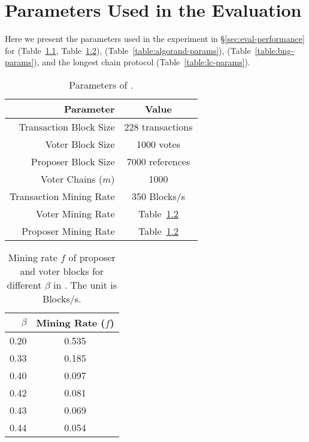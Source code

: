 \chapter{Parameters Used in the Evaluation}
\label{apx:datapoints}

Here we present the parameters used in the experiment in \S\ref{sec:eval-performance} for \prism (Table~\ref{table:prism-params}, Table~\ref{table:prism-beta}), \algorand (Table~\ref{table:algorand-params}), \bng (Table~\ref{table:bng-params}), and the longest chain protocol (Table~\ref{table:lc-params}).

\begin{table}[t]
	\centering
	\caption{Parameters of \prism.}
	\begin{tabular}{ r | c } 
	 \hline
	 Parameter & Value \\ [0.5ex] 
	 \hline\hline
	 Transaction Block Size & 228 transactions \\
	 Voter Block Size & 1000 votes \\
	 Proposer Block Size & 7000 references \\
	 Voter Chains ($m$) & 1000 \\
	 Transaction Mining Rate & 350 Blocks/s \\
	 Voter Mining Rate & Table~\ref{table:prism-beta}\\
	 Proposer Mining Rate & Table~\ref{table:prism-beta}\\
	 \hline
	\end{tabular}
\label{table:prism-params}
\end{table}

\begin{table}[t]
	\centering
        \caption[Mining rate of proposer and voter blocks in Prism.]{Mining rate $f$ of proposer and voter blocks for different $\beta$ in \prism. The unit is Blocks/s.}
	\begin{tabular}{ r | c } 
	 \hline
	 $\beta$ & Mining Rate ($f$) \\ [0.5ex] 
	 \hline\hline
	 0.20 & 0.535 \\
	 0.33 & 0.185 \\
	 0.40 & 0.097 \\
	 0.42 & 0.081 \\
	 0.43 & 0.069 \\
	 0.44 & 0.054 \\
	 \hline
	\end{tabular}
\label{table:prism-beta}
\end{table}


